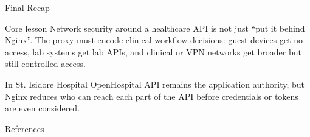 \documentclass[presentation]{beamer}
\newcommand{\scenario}{St. Isidore Hospital}
\begin{document}
\begin{frame}[c]{Final Recap}
\begin{block}{Core lesson}
Network security around a healthcare API is not just ``put it behind Nginx''. The proxy must encode
clinical workflow decisions: guest devices get no access, lab systems get lab APIs, and clinical or
VPN networks get broader but still controlled access.
\end{block}

\begin{exampleblock}{In \scenario}
OpenHospital API remains the application authority, but Nginx reduces who can reach each part of the
API before credentials or tokens are even considered.
\end{exampleblock}
\end{frame}

\begin{frame}[allowframebreaks]{References}


\end{frame}
\end{document}
